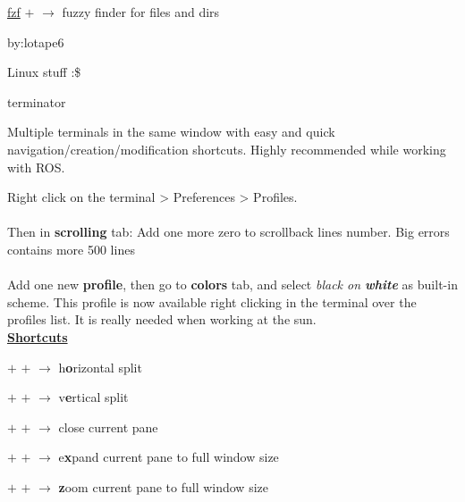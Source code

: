 \documentclass[10pt,a4paper]{article}
\begin{document}
\begin{multicols}{3}
\begin{textbox}{\href{https://github.com/junegunn/fzf}{fzf}}
 $+$  $\rightarrow$ fuzzy finder for files and dirs 
\end{textbox}


\centering
\vspace{6pt}
by:\Large \color{greenbash}lotape6 \scriptsize

\raggedright

\vfill\null
\columnbreak

\centering

\huge \color{greenbash}Linux {\color{blues}stuff} \color{white} :\$ \scriptsize 

\raggedright
\vspace{5mm}

\begin{textbox}{terminator}





Multiple terminals in the same window with easy and quick navigation/creation/modification shortcuts. Highly recommended while working with ROS.


Right click on the terminal > Preferences > Profiles.
\\\\
Then in \textbf{scrolling} tab:
Add one more zero to scrollback lines number. Big errors contains more 500 lines
\\\\
Add one new \textbf{profile}, then go to \textbf{colors} tab, and select \textit{black on \textbf{white}} as built-in scheme. This profile is now available right clicking in the terminal over the profiles list. It is really needed when working at the sun.
\\

\underline{\textbf{Shortcuts}}

 $+$  $+$  $\rightarrow$ h\textbf{o}rizontal split

 $+$  $+$  $\rightarrow$ v\textbf{e}rtical split

 $+$  $+$  $\rightarrow$ close current pane

 $+$  $+$  $\rightarrow$ e\textbf{x}pand current pane to full window size

 $+$  $+$  $\rightarrow$ \textbf{z}oom current pane to full window size


\end{textbox}
\end{multicols}
\end{document}
